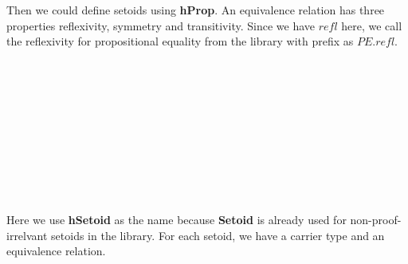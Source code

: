 Then we could define setoids using \textbf{hProp}. An equivalence relation has three properties reflexivity, symmetry and transitivity. Since we have $refl$ here, we call the reflexivity for propositional equality from the library with prefix as $PE.refl$. 

\begin{code}\>\<%
\\
%
\\
\>  \AgdaSymbol{\{} \AgdaSymbol{:} \AgdaSymbol{\}(} \AgdaSymbol{:}     \AgdaSymbol{)} \AgdaSymbol{:}  \<%
\\
\>[0]\<[2]%
\>[2] \AgdaInductiveConstructor{\_,\_,\_}\<%
\\
\>[0]\<[2]%
\>[2]\<%
\\
\>[2]\<[4]%
\>[4] \<[12]%
\>[12]\AgdaSymbol{:} \AgdaSymbol{\{} \AgdaSymbol{:} \AgdaSymbol{\}}  \AgdaFunction{<}    \AgdaFunction{>}\<%
\\
\>[2]\<[4]%
\>[4] \<[12]%
\>[12]\AgdaSymbol{:} \AgdaSymbol{\{}  \AgdaSymbol{:} \AgdaSymbol{\}}  \AgdaFunction{<}    \AgdaFunction{>}  \AgdaFunction{<}    \AgdaFunction{>}\<%
\\
\>[2]\<[4]%
\>[4] \<[12]%
\>[12]\AgdaSymbol{:} \AgdaSymbol{\{}   \AgdaSymbol{:} \AgdaSymbol{\}}  \AgdaFunction{<}    \AgdaFunction{>}  \AgdaFunction{<}    \AgdaFunction{>}  \AgdaFunction{<}    \AgdaFunction{>}\<%
\\
%
\\
\>\<\end{code}

Here we use \textbf{hSetoid} as the name because \textbf{Setoid} is
already used for non-proof-irrelvant setoids in the library.
For each setoid, we have a carrier type and an equivalence relation.

